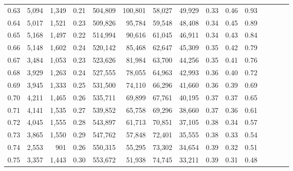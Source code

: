 \begin{tabular}{rrrcrrrrrrrrrrr}
0.63 &   5,094 &  1,349 &                                       0.21 &  504,809 &  100,801 &   58,027 &   49,929 &  0.33 &  0.46 &                         0.93 \\
0.64 &   5,017 &  1,521 &                                       0.23 &  509,826 &   95,784 &   59,548 &   48,408 &  0.34 &  0.45 &                         0.89 \\
0.65 &   5,168 &  1,497 &                                       0.22 &  514,994 &   90,616 &   61,045 &   46,911 &  0.34 &  0.43 &                         0.84 \\
0.66 &   5,148 &  1,602 &                                       0.24 &  520,142 &   85,468 &   62,647 &   45,309 &  0.35 &  0.42 &                         0.79 \\
0.67 &   3,484 &  1,053 &                                       0.23 &  523,626 &   81,984 &   63,700 &   44,256 &  0.35 &  0.41 &                         0.76 \\
0.68 &   3,929 &  1,263 &                                       0.24 &  527,555 &   78,055 &   64,963 &   42,993 &  0.36 &  0.40 &                         0.72 \\
0.69 &   3,945 &  1,333 &                                       0.25 &  531,500 &   74,110 &   66,296 &   41,660 &  0.36 &  0.39 &                         0.69 \\
0.70 &   4,211 &  1,465 &                                       0.26 &  535,711 &   69,899 &   67,761 &   40,195 &  0.37 &  0.37 &                         0.65 \\
0.71 &   4,141 &  1,535 &                                       0.27 &  539,852 &   65,758 &   69,296 &   38,660 &  0.37 &  0.36 &                         0.61 \\
0.72 &   4,045 &  1,555 &                                       0.28 &  543,897 &   61,713 &   70,851 &   37,105 &  0.38 &  0.34 &                         0.57 \\
0.73 &   3,865 &  1,550 &                                       0.29 &  547,762 &   57,848 &   72,401 &   35,555 &  0.38 &  0.33 &                         0.54 \\
0.74 &   2,553 &    901 &                                       0.26 &  550,315 &   55,295 &   73,302 &   34,654 &  0.39 &  0.32 &                         0.51 \\
0.75 &   3,357 &  1,443 &                                       0.30 &  553,672 &   51,938 &   74,745 &   33,211 &  0.39 &  0.31 &                         0.48 \\

\end{tabular}
